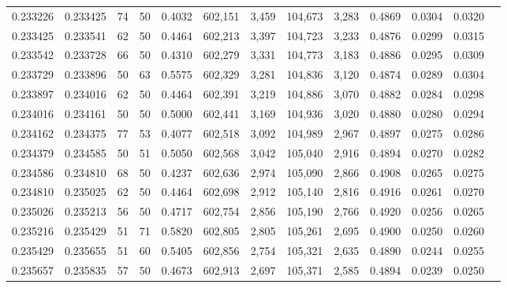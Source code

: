 \begin{tabular}{rrrrrrrrrrrrr}
0.233226 & 0.233425 &    74 &  50 &                                     0.4032 & 602,151 &   3,459 & 104,673 &   3,283 & 0.4869 & 0.0304 & 0.0320 \\
0.233425 & 0.233541 &    62 &  50 &                                     0.4464 & 602,213 &   3,397 & 104,723 &   3,233 & 0.4876 & 0.0299 & 0.0315 \\
0.233542 & 0.233728 &    66 &  50 &                                     0.4310 & 602,279 &   3,331 & 104,773 &   3,183 & 0.4886 & 0.0295 & 0.0309 \\
0.233729 & 0.233896 &    50 &  63 &                                     0.5575 & 602,329 &   3,281 & 104,836 &   3,120 & 0.4874 & 0.0289 & 0.0304 \\
0.233897 & 0.234016 &    62 &  50 &                                     0.4464 & 602,391 &   3,219 & 104,886 &   3,070 & 0.4882 & 0.0284 & 0.0298 \\
0.234016 & 0.234161 &    50 &  50 &                                     0.5000 & 602,441 &   3,169 & 104,936 &   3,020 & 0.4880 & 0.0280 & 0.0294 \\
0.234162 & 0.234375 &    77 &  53 &                                     0.4077 & 602,518 &   3,092 & 104,989 &   2,967 & 0.4897 & 0.0275 & 0.0286 \\
0.234379 & 0.234585 &    50 &  51 &                                     0.5050 & 602,568 &   3,042 & 105,040 &   2,916 & 0.4894 & 0.0270 & 0.0282 \\
0.234586 & 0.234810 &    68 &  50 &                                     0.4237 & 602,636 &   2,974 & 105,090 &   2,866 & 0.4908 & 0.0265 & 0.0275 \\
0.234810 & 0.235025 &    62 &  50 &                                     0.4464 & 602,698 &   2,912 & 105,140 &   2,816 & 0.4916 & 0.0261 & 0.0270 \\
0.235026 & 0.235213 &    56 &  50 &                                     0.4717 & 602,754 &   2,856 & 105,190 &   2,766 & 0.4920 & 0.0256 & 0.0265 \\
0.235216 & 0.235429 &    51 &  71 &                                     0.5820 & 602,805 &   2,805 & 105,261 &   2,695 & 0.4900 & 0.0250 & 0.0260 \\
0.235429 & 0.235655 &    51 &  60 &                                     0.5405 & 602,856 &   2,754 & 105,321 &   2,635 & 0.4890 & 0.0244 & 0.0255 \\
0.235657 & 0.235835 &    57 &  50 &                                     0.4673 & 602,913 &   2,697 & 105,371 &   2,585 & 0.4894 & 0.0239 & 0.0250 \\

\end{tabular}
